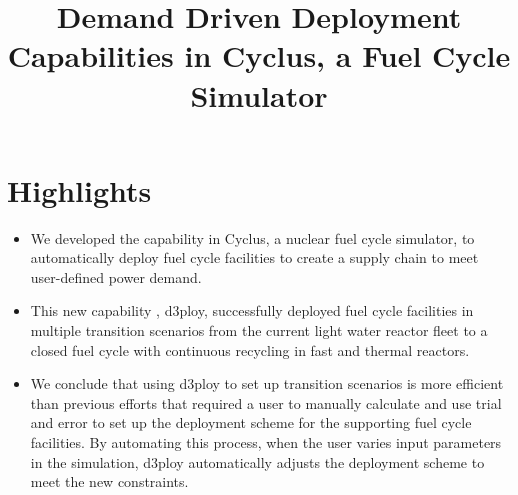 \documentclass[review]{elsarticle}
\begin{document}
\begin{frontmatter}
\title{Demand Driven Deployment Capabilities in Cyclus, a Fuel Cycle Simulator}
\end{frontmatter}
\section*{Highlights}
\begin{itemize}
       \item We developed the capability in Cyclus, a nuclear fuel cycle
       simulator, to automatically deploy fuel cycle facilities to 
       create a supply chain to meet user-defined power demand. 
       \item This new capability , d3ploy, successfully deployed fuel cycle facilities 
       in multiple transition scenarios from the current light water reactor 
       fleet to a closed fuel cycle with continuous recycling 
       in fast and thermal reactors.
       \item We conclude that using d3ploy to set up transition scenarios
       is more efficient than previous efforts that required a user to manually 
       calculate and use trial and error to set up the deployment scheme for the 
       supporting fuel cycle facilities. By automating
       this process, when the user varies input parameters in the simulation, d3ploy
       automatically adjusts the deployment scheme to meet the new constraints.
\end{itemize}
\end{document}
